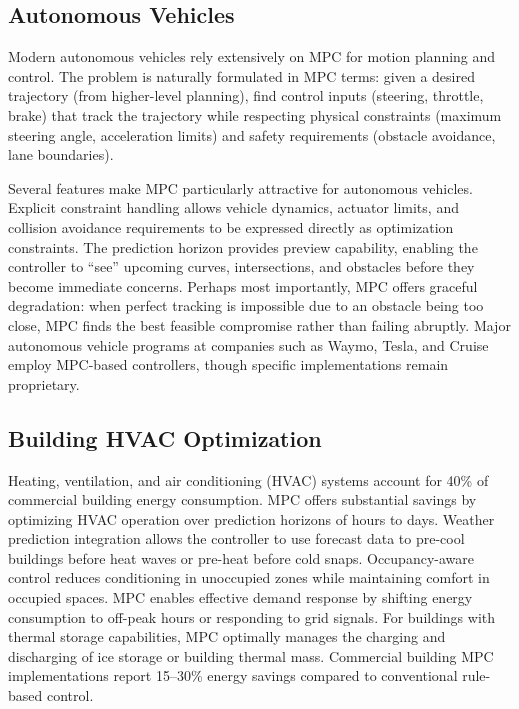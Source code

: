 \subsection{Autonomous Vehicles}

Modern autonomous vehicles rely extensively on MPC for motion planning and control. The problem is naturally formulated in MPC terms: given a desired trajectory (from higher-level planning), find control inputs (steering, throttle, brake) that track the trajectory while respecting physical constraints (maximum steering angle, acceleration limits) and safety requirements (obstacle avoidance, lane boundaries).

Several features make MPC particularly attractive for autonomous vehicles. Explicit constraint handling allows vehicle dynamics, actuator limits, and collision avoidance requirements to be expressed directly as optimization constraints. The prediction horizon provides preview capability, enabling the controller to ``see'' upcoming curves, intersections, and obstacles before they become immediate concerns. Perhaps most importantly, MPC offers graceful degradation: when perfect tracking is impossible due to an obstacle being too close, MPC finds the best feasible compromise rather than failing abruptly. Major autonomous vehicle programs at companies such as Waymo, Tesla, and Cruise employ MPC-based controllers, though specific implementations remain proprietary.

\subsection{Building HVAC Optimization}

Heating, ventilation, and air conditioning (HVAC) systems account for 40\% of commercial building energy consumption. MPC offers substantial savings by optimizing HVAC operation over prediction horizons of hours to days. Weather prediction integration allows the controller to use forecast data to pre-cool buildings before heat waves or pre-heat before cold snaps. Occupancy-aware control reduces conditioning in unoccupied zones while maintaining comfort in occupied spaces. MPC enables effective demand response by shifting energy consumption to off-peak hours or responding to grid signals. For buildings with thermal storage capabilities, MPC optimally manages the charging and discharging of ice storage or building thermal mass. Commercial building MPC implementations report 15--30\% energy savings compared to conventional rule-based control.

